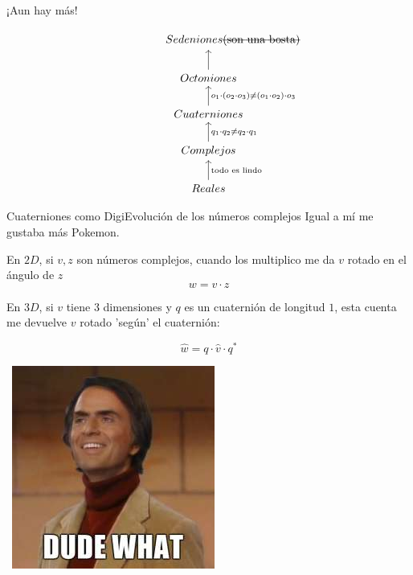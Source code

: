 \documentclass[10pt]{beamer}
\begin{document}
\begin{frame}{¡Aun hay más!}

\begin{equation}
\begin{tikzcd}
\ \ \ \ \ \ \ \ \ \ \ \ \ Sedeniones \text{\sout{(son una bosta)}}\\
Octoniones \arrow{u} \\
Cuaterniones \arrow[u, "o_1 \cdot (o_2 \cdot o_3) \neq (o_1 \cdot o_2) \cdot o_3"'] \\
Complejos  \arrow[u, "q_1 \cdot q_2 \neq q_2 \cdot q_1"', u] \\
Reales \arrow[u, "\text{todo es lindo}"'] 
\end{tikzcd}
\end{equation}


\end{frame}



\begin{frame}{Cuaterniones como DigiEvolución de los números complejos}
\tiny{Igual a mí me gustaba más Pokemon.} \bigskip

\normalsize


En $2D$, si $v,z$ son números complejos, cuando los multiplico me da $v$ rotado en el ángulo de $z$
$$w = v \cdot z$$ \pause \bigskip

En $3D$, si $v$ tiene 3 dimensiones y $q$ es un cuaternión de longitud $1$, esta cuenta me devuelve $v$ rotado 'según' el cuaternión:

$$\hat{w} = q \cdot \hat{v} \cdot q^*$$ \pause

\hbox{\hspace{8.5cm} \includegraphics[scale=0.18]{carl-sagan-dude-what.jpg}}



\end{frame}
\end{document}
